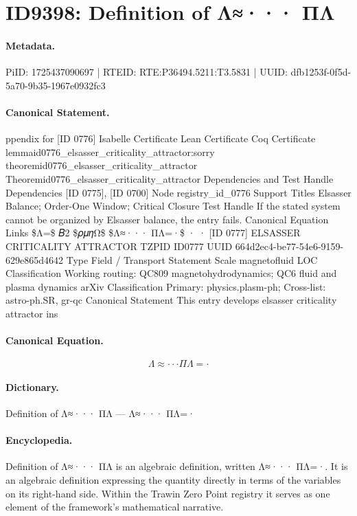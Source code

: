 \section*{ID9398: Definition of Λ≈··· ΠΛ}
\paragraph{Metadata.}
PiID: 1725437090697 | RTEID: RTE:P36494.5211:T3.5831 | UUID: dfb1253f-0f5d-5a70-9b35-1967e0932fc3

\paragraph{Canonical Statement.}
ppendix for [ID 0776] Isabelle Certificate Lean Certificate Coq Certificate lemmaid0776\_elsasser\_criticality\_attractor:sorry theoremid0776\_elsasser\_criticality\_attractor Theoremid0776\_elsasser\_criticality\_attractor Dependencies and Test Handle Dependencies [ID 0775], [ID 0700] Node registry\_id\_0776 Support Titles Elsasser Balance; Order-One Window; Critical Closure Test Handle If the stated system cannot be organized by Elsasser balance, the entry fails. Canonical Equation Links \$Λ=\$ 𝐵2 \$𝜌𝜇𝜂Ω\$ \$Λ≈··· ΠΛ=·\$ · · [ID 0777] ELSASSER CRITICALITY ATTRACTOR TZPID ID0777 UUID 664d2ec4-be77-54e6-9159-629e865d4642 Type Field / Transport Statement Scale magnetofluid LOC Classification Working routing: QC809 magnetohydrodynamics; QC6 fluid and plasma dynamics arXiv Classification Primary: physics.plasm-ph; Cross-list: astro-ph.SR, gr-qc Canonical Statement This entry develops elsasser criticality attractor ins

\paragraph{Canonical Equation.}
\[
Λ≈··· ΠΛ=·
\]

\paragraph{Dictionary.}
Definition of Λ≈··· ΠΛ — Λ≈··· ΠΛ=·

\paragraph{Encyclopedia.}
Definition of Λ≈··· ΠΛ is an algebraic definition, written Λ≈··· ΠΛ=·. It is an algebraic definition expressing the quantity directly in terms of the variables on its right-hand side. Within the Trawin Zero Point registry it serves as one element of the framework's mathematical narrative.
